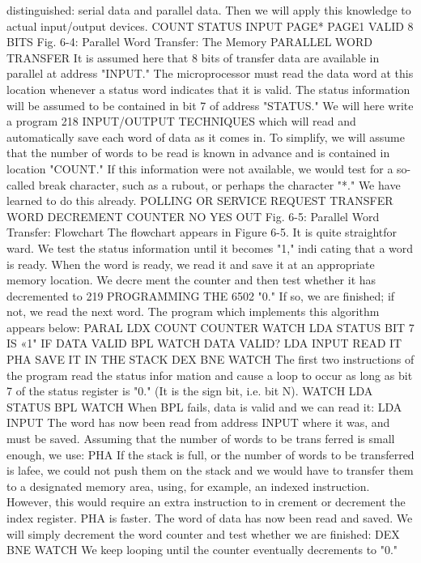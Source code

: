 \documentclass{book}
\begin{document}
distinguished: serial data and parallel data. Then we will apply
this knowledge to actual input/output devices.
COUNT
STATUS
INPUT
PAGE*
PAGE1
VALID
8 BITS
Fig. 6-4: Parallel Word Transfer: The Memory
PARALLEL WORD TRANSFER
It is assumed here that 8 bits of transfer data are available in
parallel at address "INPUT." The microprocessor must read the
data word at this location whenever a status word indicates that
it is valid. The status information will be assumed to be contained
in bit 7 of address "STATUS." We will here write a program
218
INPUT/OUTPUT TECHNIQUES
which will read and automatically save each word of data as it
comes in. To simplify, we will assume that the number of words
to be read is known in advance and is contained in location
"COUNT." If this information were not available, we would test
for a so-called break character, such as a rubout, or perhaps the
character "*." We have learned to do this already.
POLLING OR SERVICE REQUEST
TRANSFER
WORD
DECREMENT
COUNTER
NO
YES
OUT
Fig. 6-5: Parallel Word Transfer: Flowchart
The flowchart appears in Figure 6-5. It is quite straightfor
ward. We test the status information until it becomes "1," indi
cating that a word is ready. When the word is ready, we read
it and save it at an appropriate memory location. We decre
ment the counter and then test whether it has decremented to
219
PROGRAMMING THE 6502
"0." If so, we are finished; if not, we read the next word. The
program which implements this algorithm appears below:
PARAL LDX COUNT COUNTER
WATCH LDA STATUS BIT 7 IS «1" IF DATA VALID
BPL WATCH DATA VALID?
LDA INPUT READ IT
PHA SAVE IT IN THE STACK
DEX
BNE WATCH
The first two instructions of the program read the status infor
mation and cause a loop to occur as long as bit 7 of the status
register is "0." (It is the sign bit, i.e. bit N).
WATCH LDA STATUS
BPL WATCH
When BPL fails, data is valid and we can read it:
LDA INPUT
The word has now been read from address INPUT where it was,
and must be saved. Assuming that the number of words to be trans
ferred is small enough, we use:
PHA
If the stack is full, or the number of words to be transferred is lafee,
we could not push them on the stack and we would have to transfer
them to a designated memory area, using, for example, an indexed
instruction. However, this would require an extra instruction to in
crement or decrement the index register. PHA is faster.
The word of data has now been read and saved. We will simply
decrement the word counter and test whether we are finished:
DEX
BNE WATCH
We keep looping until the counter eventually decrements to "0."
\end{document}
